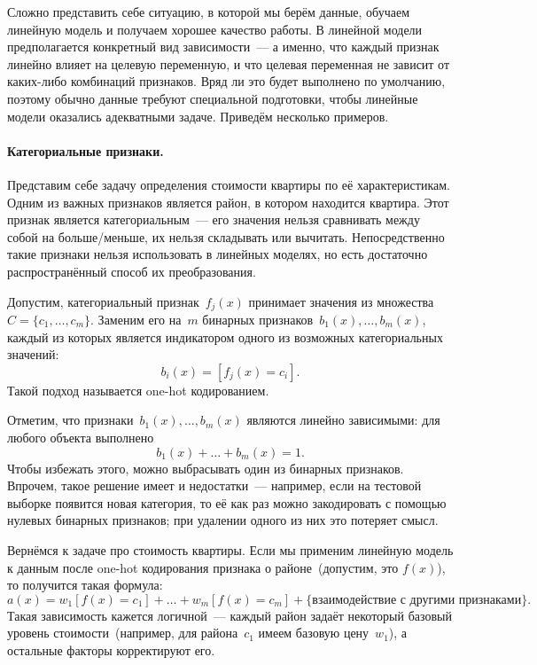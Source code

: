 \documentclass[12pt,fleqn]{article}
\begin{document}
Сложно представить себе ситуацию, в которой мы берём данные, обучаем линейную модель и получаем хорошее качество работы.
В линейной модели предполагается конкретный вид зависимости~--- а именно, что каждый признак линейно влияет на целевую переменную,
и что целевая переменная не зависит от каких-либо комбинаций признаков.
Вряд ли это будет выполнено по умолчанию, поэтому обычно данные требуют специальной подготовки, чтобы линейные модели
оказались адекватными задаче.
Приведём несколько примеров.

\paragraph{Категориальные признаки.}
Представим себе задачу определения стоимости квартиры по её характеристикам.
Одним из важных признаков является район, в котором находится квартира.
Этот признак является категориальным~--- его значения нельзя сравнивать между собой на больше/меньше,
их нельзя складывать или вычитать.
Непосредственно такие признаки нельзя использовать в линейных моделях, но есть
достаточно распространённый способ их преобразования.

Допустим, категориальный признак~$f_j(x)$ принимает значения из множества~$C = \{c_1, \dots, c_m\}$.
Заменим его на~$m$ бинарных признаков~$b_1(x), \dots, b_m(x)$, каждый из которых
является индикатором одного из возможных категориальных значений:
\[
    b_i(x) = [f_j(x) = c_i].
\]
Такой подход называется one-hot кодированием.

Отметим, что признаки~$b_1(x), \dots, b_m(x)$ являются линейно зависимыми:
для любого объекта выполнено
\[
    b_1(x) + \dots + b_m(x) = 1.
\]
Чтобы избежать этого, можно выбрасывать один из бинарных признаков.
Впрочем, такое решение имеет и недостатки~--- например, если на тестовой выборке
появится новая категория, то её как раз можно закодировать с помощью нулевых бинарных признаков;
при удалении одного из них это потеряет смысл.

Вернёмся к задаче про стоимость квартиры.
Если мы применим линейную модель к данным после one-hot кодирования признака о районе~(допустим, это $f(x)$), то получится
такая формула:
\[
    a(x)
    =
    w_1 [f(x) = c_1]
    +
    \dots
    +
    w_m [f(x) = c_m]
    +
    \{
        \text{взаимодействие с другими признаками}
    \}.
\]
Такая зависимость кажется логичной~--- каждый район задаёт некоторый базовый уровень
стоимости~(например, для района~$c_1$ имеем базовую цену~$w_1$),
а остальные факторы корректируют его.
\end{document}
